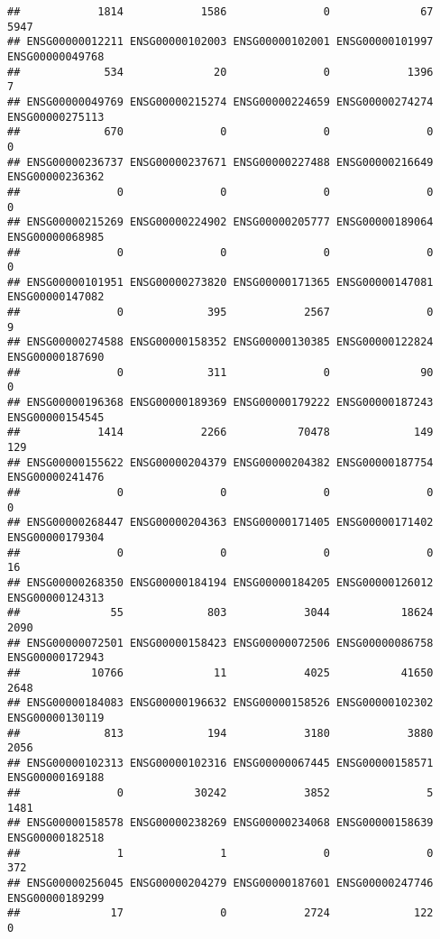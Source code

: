 \documentclass[
]{article}
\begin{document}
\begin{verbatim}
##            1814            1586               0              67            5947 
## ENSG00000012211 ENSG00000102003 ENSG00000102001 ENSG00000101997 ENSG00000049768 
##             534              20               0            1396               7 
## ENSG00000049769 ENSG00000215274 ENSG00000224659 ENSG00000274274 ENSG00000275113 
##             670               0               0               0               0 
## ENSG00000236737 ENSG00000237671 ENSG00000227488 ENSG00000216649 ENSG00000236362 
##               0               0               0               0               0 
## ENSG00000215269 ENSG00000224902 ENSG00000205777 ENSG00000189064 ENSG00000068985 
##               0               0               0               0               0 
## ENSG00000101951 ENSG00000273820 ENSG00000171365 ENSG00000147081 ENSG00000147082 
##               0             395            2567               0               9 
## ENSG00000274588 ENSG00000158352 ENSG00000130385 ENSG00000122824 ENSG00000187690 
##               0             311               0              90               0 
## ENSG00000196368 ENSG00000189369 ENSG00000179222 ENSG00000187243 ENSG00000154545 
##            1414            2266           70478             149             129 
## ENSG00000155622 ENSG00000204379 ENSG00000204382 ENSG00000187754 ENSG00000241476 
##               0               0               0               0               0 
## ENSG00000268447 ENSG00000204363 ENSG00000171405 ENSG00000171402 ENSG00000179304 
##               0               0               0               0              16 
## ENSG00000268350 ENSG00000184194 ENSG00000184205 ENSG00000126012 ENSG00000124313 
##              55             803            3044           18624            2090 
## ENSG00000072501 ENSG00000158423 ENSG00000072506 ENSG00000086758 ENSG00000172943 
##           10766              11            4025           41650            2648 
## ENSG00000184083 ENSG00000196632 ENSG00000158526 ENSG00000102302 ENSG00000130119 
##             813             194            3180            3880            2056 
## ENSG00000102313 ENSG00000102316 ENSG00000067445 ENSG00000158571 ENSG00000169188 
##               0           30242            3852               5            1481 
## ENSG00000158578 ENSG00000238269 ENSG00000234068 ENSG00000158639 ENSG00000182518 
##               1               1               0               0             372 
## ENSG00000256045 ENSG00000204279 ENSG00000187601 ENSG00000247746 ENSG00000189299 
##              17               0            2724             122               0 

\end{verbatim}
\end{document}
